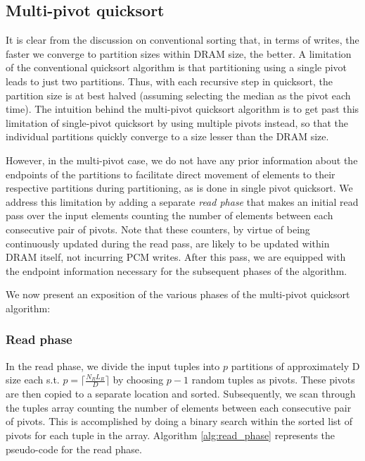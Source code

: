 \begin{comment}
In the quicksort algorithm on randomly permuted $N_R$ tuples, the average number of swaps is $0.33N_Rln(N_R)$ \cite{swaps}. If each pair of swapped tuples gets evicted from DRAM to PCM after each intermediate swap, there will be two tuple writes (of $L_R$ bytes each) in PCM per pair of swapped tuples. Hence, the total number of writes is given by:  
\end{comment}
\subsection{Multi-pivot quicksort}
\label{subsec:sort_mpivot}
It is clear from the discussion on conventional sorting that, in terms of writes, the faster we converge to partition sizes within DRAM size, the better. A limitation of the conventional quicksort algorithm is that partitioning using a single pivot leads to just two partitions. Thus, with each recursive step in quicksort, the partition size is at best halved (assuming selecting the median as the pivot each time). The intuition behind the multi-pivot quicksort algorithm is to get past this limitation of single-pivot quicksort by using multiple pivots instead, so that the individual partitions quickly converge to a size lesser than the DRAM size.

However, in the multi-pivot case, we do not have any prior information about the endpoints of the partitions to facilitate direct movement of elements to their respective partitions during partitioning, as is done in single pivot quicksort. We address this limitation by adding a separate \textit{read phase} that makes an initial read pass over the input elements counting the number of elements between each consecutive pair of pivots. Note that these counters, by virtue of being continuously updated during the read pass, are likely to be updated within DRAM itself, not incurring PCM writes. After this pass, we are equipped with the endpoint information necessary for the subsequent phases of the algorithm.

We now present an exposition of the various phases of the multi-pivot quicksort algorithm:

\subsubsection{Read phase} 



In the read phase, we divide the input tuples into $p$ partitions of approximately D size each s.t. $p = \lceil \frac{N_R L_R}{D} \rceil$ by choosing $p-1$ random tuples as pivots. These pivots are then copied to a separate location and sorted. Subsequently, we scan through the tuples array counting the number of elements between each consecutive pair of pivots. This is accomplished by doing a binary search within the sorted list of pivots for each tuple in the array. Algorithm \ref{alg:read_phase} represents the pseudo-code for the read phase.

